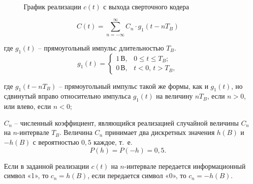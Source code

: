 \documentclass[a4paper, 12pt]{article}
\begin{document}
\begin{enumerate}
\begin{figure}[H]
    \caption{График реализации $c(t)$ с выхода сверточного кодера}
  \end{figure}

  \begin{equation}
    C(t)=\sum^\infty_{n=-\infty}C_n\cdot g_1(t-nT_B) 
  \end{equation}

  где $g_1(t)$ -- прямоугольный импульс длительностью $T_B$.
  \begin{equation}
    g_1(t)=\begin{cases}
        1\,В, & 0\leq t \leq T_B;\\
        0\,В, & t<0,\,t>T_B,
      \end{cases} 
  \end{equation}

  где $g_1(t-nT_B)$ -- прямоугольный импульс такой же формы, 
  как и $g_1(t)$, но сдвинутый вправо относительно импульса 
  $g_1(t)$ на величину $nT_B$, если $n>0$, или 
  влево, если $n<0$; 
  
  $C_n$ -- численный коэффициент, являющийся реализацией 
  случайной величины $C_n$ на $n$-интервале $T_B$.
  Величина $C_n$ принимает два дискретных значения $h(B)$ и 
  $-h(B)$ с вероятностью $0,5$ каждое, \mbox{т. е.} 
  \begin{equation}
    P(h)=P(-h)=0,5. 
  \end{equation}

  Если в заданной реализации $c(t)$ на $n$-интервале передается 
  информационный символ «1», то $c_n=h(B)$, 
  если передается символ «0», то $c_n=-h(B)$.


\end{enumerate}
\end{document}
